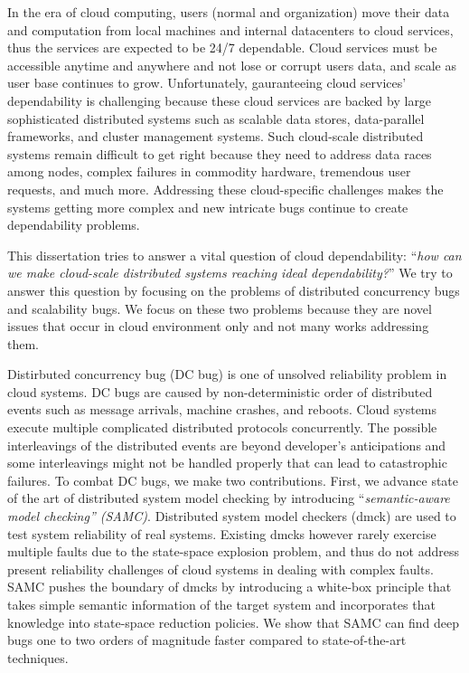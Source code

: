 In the era of cloud computing, users (normal and organization) move their data
and computation from local machines and internal datacenters to cloud services,
thus the services are expected to be 24/7 dependable. Cloud services must be
accessible anytime and anywhere and not lose or corrupt users data, and scale as
user base continues to grow.  Unfortunately, gauranteeing cloud services'
dependability is challenging because these cloud services are backed by large
sophisticated distributed systems such as scalable data stores, data-parallel
frameworks, and cluster management systems. Such cloud-scale distributed systems
remain difficult to get right because they need to address data races among
nodes, complex failures in commodity hardware, tremendous user requests, and
much more. Addressing these cloud-specific challenges makes the systems getting
more complex and new intricate bugs continue to create dependability problems.

This dissertation tries to answer a vital question of cloud dependability:
``{\em how can we make cloud-scale distributed systems reaching ideal
dependability?}'' We try to answer this question by focusing on the problems of
distributed concurrency bugs and scalability bugs. We focus on these two
problems because they are novel issues that occur in cloud environment only and
not many works addressing them.

Distirbuted concurrency bug (DC bug) is one of unsolved reliability problem in
cloud systems. DC bugs are caused by non-deterministic order of distributed
events such as message arrivals, machine crashes, and reboots. Cloud systems
execute multiple complicated distributed protocols concurrently. The possible
interleavings of the distributed events are beyond developer's anticipations and
some interleavings might not be handled properly that can lead to catastrophic
failures.
%
To combat DC bugs, we make two contributions. First, we advance state of the
art of distributed system model checking by introducing ``{\em semantic-aware
model checking'' (SAMC)}. Distributed system model checkers (dmck) are used to
test system reliability of real systems. Existing dmcks however rarely exercise
multiple faults due to the state-space explosion problem, and thus do not
address present reliability challenges of cloud systems in dealing with complex
faults. SAMC pushes the boundary of dmcks by introducing a white-box principle
that takes simple semantic information of the target system and incorporates
that knowledge into state-space reduction policies.  We show that SAMC can find
deep bugs one to two orders of magnitude faster compared to state-of-the-art
techniques. 

